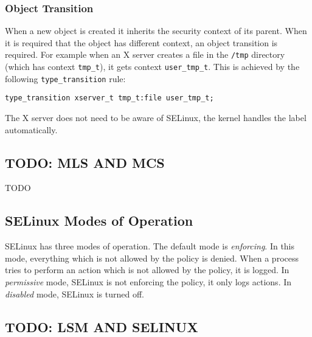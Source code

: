 \subsubsection{Object Transition}
When a new object is created it inherits the security context of its parent.
When it is required that the object has different context, an object transition
is required.
For example when an X server creates a file in the \texttt{/tmp} directory
(which has context \texttt{tmp\_t}), it gets context \texttt{user\_tmp\_t}. This
is achieved by the following \texttt{type\_transition} rule:
\begin{lstlisting}
type_transition xserver_t tmp_t:file user_tmp_t;
\end{lstlisting}
The X server does not need to be aware of SELinux, the kernel handles the label
automatically.

\subsection{TODO: MLS AND MCS}

TODO

\subsection{SELinux Modes of Operation}

SELinux has three modes of operation. The default mode is \emph{enforcing}. In
this mode, everything which is not allowed by the policy is denied. When a
process tries to perform an action which is not allowed by the policy, it is
logged. In \emph{permissive} mode, SELinux is not enforcing the policy, it only
logs actions. In \emph{disabled} mode, SELinux is turned off.

\subsection{TODO: LSM AND SELINUX}

